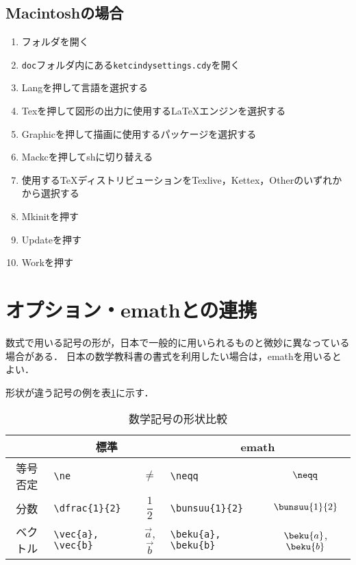 \subsection{Macintoshの場合}
\begin{enumerate}
    \item {\ketcindy}フォルダを開く
    \item \verb|doc|フォルダ内にある\verb|ketcindysettings.cdy|を開く
    \item Langを押して言語を選択する
    \item Texを押して図形の出力に使用する{\LaTeX}エンジンを選択する
    \item Graphicを押して描画に使用するパッケージを選択する
    \item Mackcを押してshに切り替える
    \item 使用する{\TeX}ディストリビューションをTexlive，Kettex，Otherのいずれかから選択する
    \item Mkinitを押す
    \item Updateを押す
    \item Workを押す
\end{enumerate}

\newpage

\section{オプション・emathとの連携}
数式で用いる記号の形が，日本で一般的に用いられるものと微妙に異なっている場合がある．
日本の数学教科書の書式を利用したい場合は，emathを用いるとよい．

形状が違う記号の例を表\ref{tab:math-symbol}に示す．
\begin{table}[h]
    \renewcommand{\arraystretch}{1.5}
    \centering
    \caption{数学記号の形状比較}
    \label{tab:math-symbol}
    \begin{tabular}{c||lc|lc}
                 & \multicolumn{2}{c|}{標準}                      & \multicolumn{2}{c}{emath}                          \\
        \hline
        等号否定 & \verb|\ne|              & $\neq$               & \verb|\neqq|              & $\neqq$                \\
        分数     & \verb|\dfrac{1}{2}|     & $\dfrac{1}{2}$       & \verb|\bunsuu{1}{2}|      & $\bunsuu{1}{2}$        \\
        ベクトル & \verb|\vec{a}, \vec{b}| & $\vec{a}$, $\vec{b}$ & \verb|\beku{a}, \beku{b}| & $\beku{a}$, $\beku{b}$
    \end{tabular}
\end{table}

